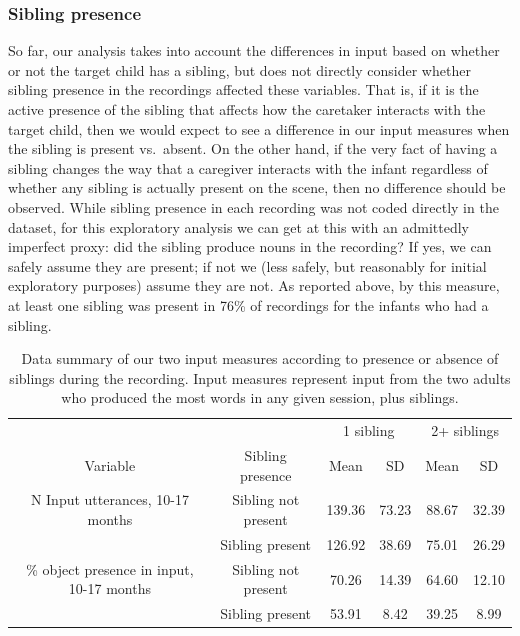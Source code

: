 \documentclass[
  man,mask,floatsintext]{apa6}
\begin{document}
\hypertarget{sibling-presence}{%
\subsubsection{Sibling presence}\label{sibling-presence}}

So far, our analysis takes into account the differences in input based on whether or not the target child has a sibling, but does not directly consider whether sibling presence in the recordings affected these variables. That is, if it is the active presence of the sibling that affects how the caretaker interacts with the target child, then we would expect to see a difference in our input measures when the sibling is present vs.~absent. On the other hand, if the very fact of having a sibling changes the way that a caregiver interacts with the infant regardless of whether any sibling is actually present on the scene, then no difference should be observed. While sibling presence in each recording was not coded directly in the dataset, for this exploratory analysis we can get at this with an admittedly imperfect proxy: did the sibling produce nouns in the recording? If yes, we can safely assume they are present; if not we (less safely, but reasonably for initial exploratory purposes) assume they are not. As reported above, by this measure, at least one sibling was present in 76\% of recordings for the infants who had a sibling.

\begin{table}[!h]

\caption{\label{tab:sib-presence-table-data-summary}Data summary of our two input measures according to presence or absence of siblings during the recording. Input measures represent input from the two adults who produced the most words in any given session, plus siblings.}
\centering
\begin{tabular}[t]{cccccc}
\toprule
\multicolumn{2}{c}{ } & \multicolumn{2}{c}{1 sibling} & \multicolumn{2}{c}{2+ siblings} \\
\cmidrule(l{3pt}r{3pt}){3-4} \cmidrule(l{3pt}r{3pt}){5-6}
\multicolumn{1}{c}{Variable} & \multicolumn{1}{c}{Sibling presence} & \multicolumn{1}{c}{Mean} & \multicolumn{1}{c}{SD} & \multicolumn{1}{c}{Mean} & \multicolumn{1}{c}{SD} \\
\cmidrule(l{3pt}r{3pt}){1-1} \cmidrule(l{3pt}r{3pt}){2-2} \cmidrule(l{3pt}r{3pt}){3-3} \cmidrule(l{3pt}r{3pt}){4-4} \cmidrule(l{3pt}r{3pt}){5-5} \cmidrule(l{3pt}r{3pt}){6-6}
N Input utterances, 10-17 months & Sibling not present & 139.36 & 73.23 & 88.67 & 32.39\\
 & Sibling present & 126.92 & 38.69 & 75.01 & 26.29\\
\% object presence in input, 10-17 months & Sibling not present & 70.26 & 14.39 & 64.60 & 12.10\\
 & Sibling present & 53.91 & 8.42 & 39.25 & 8.99\\
\bottomrule
\end{tabular}
\end{table}
\end{document}
